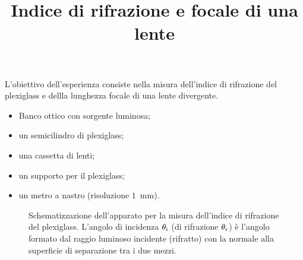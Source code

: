 \documentclass{lab1-article}
\title{Indice di rifrazione e focale di una lente}
\begin{document}
\begin{article}

\maketitle

\secsummary

L'obiettivo dell'esperienza consiste nella misura dell'indice di rifrazione
del plexiglass e dellla lunghezza focale di una lente divergente.


\secmaterials

\begin{itemize}
\item Banco ottico con sorgente luminosa;
\item un semicilindro di plexiglass;
\item una cassetta di lenti;
\item un supporto per il plexiglass;
\item un metro a nastro (risoluzione $1$~mm).
\end{itemize}


\secmeasurements



\begin{figure}[htb!]
  \caption{Schematizzazione dell'apparato per la misura dell'indice di
    rifrazione del plexiglass.
    L'angolo di incidenza $\theta_{\rm i}$ (di rifrazione $\theta_{\rm r}$)
    \`e l'angolo formato dal raggio luminoso incidente (rifratto) con la
    normale alla superficie di separazione tra i due mezzi.}
  \label{fig:plexiglass}
\end{figure}



\end{article}
\end{document}
